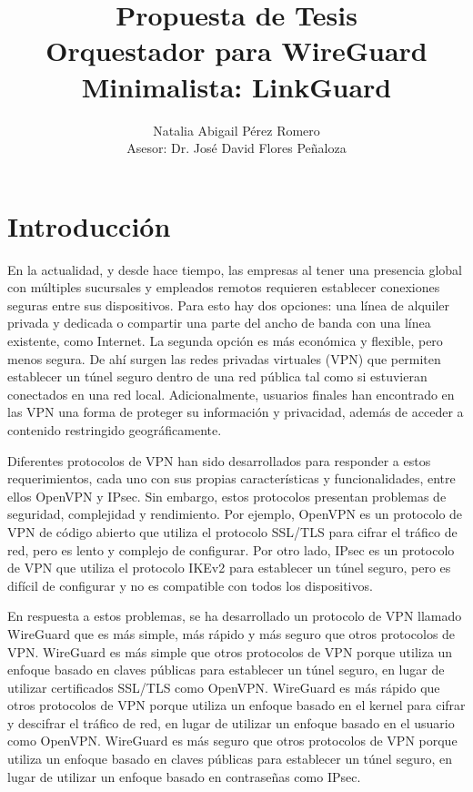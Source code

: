 \documentclass[letterpaper,12pt,oneside]{article}
\title{Propuesta de Tesis \\ Orquestador para WireGuard Minimalista: LinkGuard}
\author{Natalia Abigail Pérez Romero \\ Asesor: Dr. José David Flores Peñaloza}
\date{}  %
\begin{document}
\maketitle


\section{Introducción}

En la actualidad, y desde hace tiempo, las empresas al tener una presencia global con múltiples sucursales y empleados remotos requieren establecer conexiones seguras entre sus dispositivos. Para esto hay dos opciones: una línea de alquiler privada y dedicada o compartir una parte del ancho de banda con una línea existente, como Internet. La segunda opción es más económica y flexible, pero menos segura. De ahí surgen las redes privadas virtuales (VPN) que permiten establecer un túnel seguro dentro de una red pública tal como si estuvieran conectados en una red local. Adicionalmente, usuarios finales han encontrado en las VPN una forma de proteger su información y privacidad, además de acceder a contenido restringido geográficamente.

Diferentes protocolos de VPN han sido desarrollados para responder a estos requerimientos, cada uno con sus propias características y funcionalidades, entre ellos OpenVPN y IPsec. Sin embargo, estos protocolos presentan problemas de seguridad, complejidad y rendimiento. Por ejemplo, OpenVPN es un protocolo de VPN de código abierto que utiliza el protocolo SSL/TLS para cifrar el tráfico de red, pero es lento y complejo de configurar. Por otro lado, IPsec es un protocolo de VPN que utiliza el protocolo IKEv2 para establecer un túnel seguro, pero es difícil de configurar y no es compatible con todos los dispositivos.

En respuesta a estos problemas, se ha desarrollado un protocolo de VPN llamado WireGuard que es más simple, más rápido y más seguro que otros protocolos de VPN. WireGuard es más simple que otros protocolos de VPN porque utiliza un enfoque basado en claves públicas para establecer un túnel seguro, en lugar de utilizar certificados SSL/TLS como OpenVPN. WireGuard es más rápido que otros protocolos de VPN porque utiliza un enfoque basado en el kernel para cifrar y descifrar el tráfico de red, en lugar de utilizar un enfoque basado en el usuario como OpenVPN. WireGuard es más seguro que otros protocolos de VPN porque utiliza un enfoque basado en claves públicas para establecer un túnel seguro, en lugar de utilizar un enfoque basado en contraseñas como IPsec.
\end{document}

